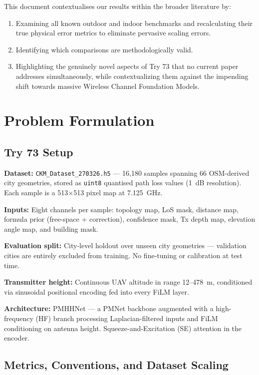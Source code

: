 \documentclass[11pt,a4paper]{article}
\begin{document}
This document contextualises our results within the broader literature by:
\begin{enumerate}[nosep]
    \item Examining all known outdoor and indoor benchmarks and recalculating their true physical error metrics to eliminate pervasive scaling errors.
    \item Identifying which comparisons are methodologically valid.
    \item Highlighting the genuinely novel aspects of Try 73 that no current paper addresses simultaneously, while contextualizing them against the impending shift towards massive Wireless Channel Foundation Models.
\end{enumerate}

\section{Problem Formulation}
\label{sec:problem}

\subsection{Try 73 Setup}

\textbf{Dataset:} \texttt{CKM\_Dataset\_270326.h5} — 16,180 samples spanning 66
OSM-derived city geometries, stored as \texttt{uint8} quantised path loss values (1~dB
resolution). Each sample is a 513$\times$513 pixel map at 7.125~GHz.

\textbf{Inputs:} Eight channels per sample: topology map, LoS mask, distance map,
formula prior (free-space + correction), confidence mask, Tx depth map, elevation
angle map, and building mask.

\textbf{Evaluation split:} City-level holdout over unseen city geometries —
validation cities are entirely excluded from training. No fine-tuning or
calibration at test time.

\textbf{Transmitter height:} Continuous UAV altitude in range 12--478~m, conditioned
via sinusoidal positional encoding fed into every FiLM layer.

\textbf{Architecture:} PMHHNet — a PMNet backbone augmented with a high-frequency
(HF) branch processing Laplacian-filtered inputs and FiLM conditioning on antenna
height. Squeeze-and-Excitation (SE) attention in the encoder.

\subsection{Metrics, Conventions, and Dataset Scaling}
\end{document}
